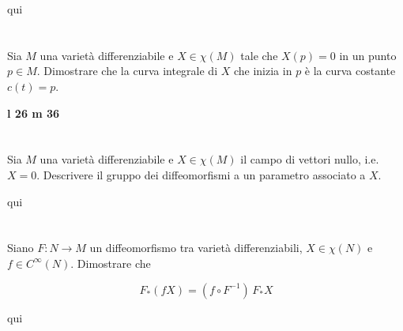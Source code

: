 qui

%

\newpage

%

\section{}\label{es2-32}

\begin{tcolorbox}
	Sia $ M $ una varietà differenziabile e $ X \in \chi(M) $ tale che $ X(p) = 0 $ in un punto $ p \in M $. Dimostrare che la curva integrale di $ X $ che inizia in $ p $ è la curva costante $ c(t)=p $.
\end{tcolorbox}

\textbf{l 26 m 36}

%

\newpage

%

\section{}\label{es2-33}

\begin{tcolorbox}
	Sia $ M $ una varietà differenziabile e $ X \in \chi(M) $ il campo di vettori nullo, i.e. $ X = 0 $. Descrivere il gruppo dei diffeomorfismi a un parametro associato a $ X $.
\end{tcolorbox}

qui

%

\newpage

%

\section{}\label{es2-34}

\begin{tcolorbox}
	Siano $ F : N \to M $ un diffeomorfismo tra varietà differenziabili, $ X \in \chi(N) $ e $ f \in C^{\infty}(N) $. Dimostrare che
	
	\begin{equation}
		F_{*}(f X) = (f \circ F^{-1}) \, F_{*} X
	\end{equation}
\end{tcolorbox}

qui

